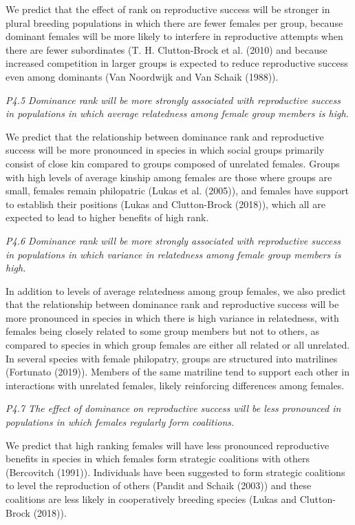 \documentclass[
]{article}
\begin{document}
We predict that the effect of rank on reproductive success will be
stronger in plural breeding populations in which there are fewer females
per group, because dominant females will be more likely to interfere in
reproductive attempts when there are fewer subordinates (T. H.
Clutton-Brock et al. (2010) and because increased competition in larger
groups is expected to reduce reproductive success even among dominants
(Van Noordwijk and Van Schaik (1988)).

\emph{P4.5 Dominance rank will be more strongly associated with
reproductive success in populations in which average relatedness among
female group members is high.}

We predict that the relationship between dominance rank and reproductive
success will be more pronounced in species in which social groups
primarily consist of close kin compared to groups composed of unrelated
females. Groups with high levels of average kinship among females are
those where groups are small, females remain philopatric (Lukas et al.
(2005)), and females have support to establish their positions (Lukas
and Clutton-Brock (2018)), which all are expected to lead to higher
benefits of high rank.

\emph{P4.6 Dominance rank will be more strongly associated with
reproductive success in populations in which variance in relatedness
among female group members is high.}

In addition to levels of average relatedness among group females, we
also predict that the relationship between dominance rank and
reproductive success will be more pronounced in species in which there
is high variance in relatedness, with females being closely related to
some group members but not to others, as compared to species in which
group females are either all related or all unrelated. In several
species with female philopatry, groups are structured into matrilines
(Fortunato (2019)). Members of the same matriline tend to support each
other in interactions with unrelated females, likely reinforcing
differences among females.

\emph{P4.7 The effect of dominance on reproductive success will be less
pronounced in populations in which females regularly form coalitions.}

We predict that high ranking females will have less pronounced
reproductive benefits in species in which females form strategic
coalitions with others (Bercovitch (1991)). Individuals have been
suggested to form strategic coalitions to level the reproduction of
others (Pandit and Schaik (2003)) and these coalitions are less likely
in cooperatively breeding species (Lukas and Clutton-Brock (2018)).
\end{document}
